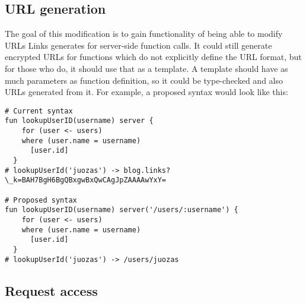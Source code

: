 \subsection{URL generation}

The goal of this modification is to gain functionality of being able to modify URLs Links generates for server-side function calls. It could still generate encrypted URLs for functions which do not explicitly define the URL format, but for those who do, it should use that as a template. A template should have as much parameters as function definition, so it could be type-checked and also URLs generated from it. For example, a proposed syntax would look like this:

\begin{codelisting}
\begin{verbatim}
# Current syntax
fun lookupUserID(username) server {
    for (user <- users)
    where (user.name = username)
      [user.id]
  }
# lookupUserId('juozas') -> blog.links?\_k=BAH7BgH6BgQBxgwBxQwCAgJpZAAAAwYxY=

# Proposed syntax
fun lookupUserID(username) server('/users/:username') {
    for (user <- users)
    where (user.name = username)
      [user.id]
  }
# lookupUserId('juozas') -> /users/juozas
\end{verbatim}
\end{codelisting}

\subsection{Request access}


